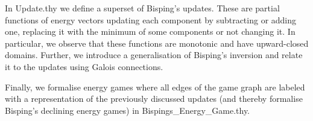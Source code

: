In Update.thy we define a superset of Bisping's updates. These are partial functions of energy vectors updating each component by subtracting or adding one, replacing it with the minimum of some components or not changing it. In particular, we observe that these functions are monotonic and have upward-closed domains.
Further, we introduce a generalisation of Bisping's inversion and relate it to the updates using Galois connections. 

Finally, we formalise energy games where all edges of the game graph are labeled with a representation of the previously discussed updates (and thereby formalise Bisping's declining energy games) in Bispings\_Energy\_Game.thy.
